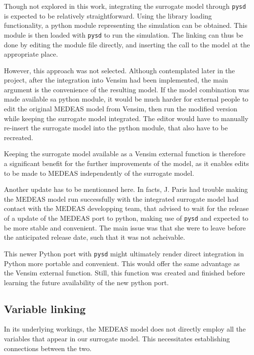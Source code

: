 Though not explored in this work, integrating the surrogate model through \texttt{pysd} is expected to be relatively straightforward. Using the library loading functionality, a python module representing the simulation can be obtained. This module is then loaded with \texttt{pysd} to run the simulation. The linking can thus be done by editing the module file directly, and inserting the call to the model at the appropriate place. 

However, this approach was not selected. Although contemplated later in the project, after the integration into Vensim had been implemented, the main argument is the convenience of the resulting model. If the model combination was made available sa python module, it would be much harder for external people to edit the original MEDEAS model from Vensim, then run the modified version while keeping the surrogate model integrated. The editor would have to manually re-insert the surrogate model into the python module, that also have to be recreated.

Keeping the surrogate model available as a Vensim external function is therefore a significant benefit for the further improvements of the model, as it enables edits to be made to MEDEAS independently of the surrogate model.

Another update has to be mentionned here. In facts, J. Paris had trouble making the MEDEAS model run successfully with the integrated surrogate model had contact with the MEDEAS developping team, that advised to wait for the release of a update of the MEDEAS port to python, making use of \texttt{pysd} and expected to be more stable and convenient. The main issue was that she were to leave before the anticipated release date, such that it was not acheivable.

This newer Python port with \texttt{pysd} might ultimately render direct integration in Python more portable and convenient. This would offer the same advantage as the Vensim external function. Still, this function was created and finished before learning the future availability of the new python port.

\subsection{Variable linking}

In its underlying workings, the MEDEAS model does not directly employ all the variables that appear in our surrogate model. This necessitates establishing connections between the two.

